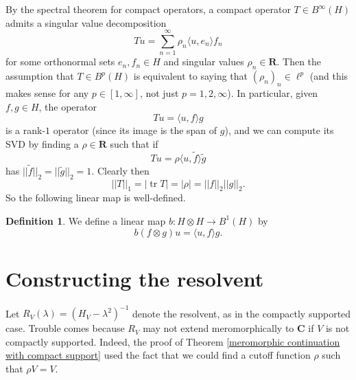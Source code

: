 \documentclass[12pt]{report}
\newcommand{\RR}{\mathbf{R}}
\newcommand{\CC}{\mathbf{C}}
\newcommand{\tr}{\operatorname{tr}}
\theoremstyle{definition}
\newtheorem{definition}[theorem]{Definition}
\begin{document}
By the spectral theorem for compact operators, a compact operator $T \in B^\infty(H)$ admits a singular value decomposition
$$Tu = \sum_{n=1}^\infty \rho_n \langle u, e_n\rangle f_n$$
for some orthonormal sets $e_n,f_n \in H$ and singular values $\rho_n \in \RR$. Then the assumption that $T \in B^p(H)$ is equivalent to saying that $(\rho_n)_n \in \ell^p$ (and this makes sense for any $p \in [1, \infty]$, not just $p =1,2,\infty$). In particular, given $f, g \in H$, the operator
$$Tu = \langle u, f \rangle g$$
is a rank-$1$ operator (since its image is the span of $g$), and we can compute its SVD by finding a $\rho \in \RR$ such that if
$$Tu = \rho \langle u, \tilde f \rangle \tilde g$$
has $||\tilde f||_2 = ||\tilde g||_2 = 1$. Clearly then
\begin{equation}\label{b1 norm of a tensor product}||T||_1 = |\tr T| = |\rho| = ||f||_2 ||g||_2.\end{equation}
So the following linear map is well-defined.
\begin{definition}
\label{tensor products are trace class}
We define a linear map $b: H \otimes H \to B^1(H)$ by
$$b(f \otimes g)u = \langle u, f \rangle g.$$
\end{definition}


\section{Constructing the resolvent}
Let $R_V(\lambda) = (H_V - \lambda^2)^{-1}$ denote the resolvent, as in the compactly supported case. Trouble comes because $R_V$ may not extend meromorphically to $\CC$ if $V$ is not compactly supported. Indeed, the proof of Theorem \ref{meromorphic continuation with compact support} used the fact that we could find a cutoff function $\rho$ such that $\rho V = V$.
\end{document}
